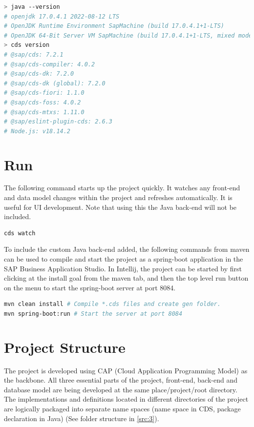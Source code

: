 \begin{lstlisting}[language={bash}]
> java --version
# openjdk 17.0.4.1 2022-08-12 LTS
# OpenJDK Runtime Environment SapMachine (build 17.0.4.1+1-LTS)
# OpenJDK 64-Bit Server VM SapMachine (build 17.0.4.1+1-LTS, mixed mode, sharing)
> cds version
# @sap/cds: 7.2.1
# @sap/cds-compiler: 4.0.2
# @sap/cds-dk: 7.2.0
# @sap/cds-dk (global): 7.2.0
# @sap/cds-fiori: 1.1.0
# @sap/cds-foss: 4.0.2
# @sap/cds-mtxs: 1.11.0
# @sap/eslint-plugin-cds: 2.6.3
# Node.js: v18.14.2
\end{lstlisting}

\section{Run}
\label{sec:D-run}

The following command starts up the project quickly. It watches any front-end and data model changes within the project and refreshes automatically. It is useful for UI development. Note that using this the Java back-end will not be included.

\begin{lstlisting}[language={bash}]
cds watch 
\end{lstlisting}

To include the custom Java back-end added, the following commands from maven can be used to compile and start the project as a spring-boot application in the SAP Business Application Studio. In Intellij, the project can be started by first clicking at the install goal from the maven tab, and then the top level run button on the menu to start the spring-boot server at port 8084.
\begin{lstlisting}[language={bash}]
mvn clean install # Compile *.cds files and create gen folder.
mvn spring-boot:run # Start the server at port 8084
\end{lstlisting}

\section{Project Structure}
\label{sec:D-AppStructure}

The project is developed using CAP (Cloud Application Programming Model) \cite{cap-welcome} as the backbone. 
All three essential parts of the project, front-end, back-end and database model are being developed at the same place/project/root directory. 
The implementations and definitions located in different directories of the project are logically packaged into separate name spaces (name space in CDS, package declaration in Java) (See folder structure in \autoref{src:3}).


